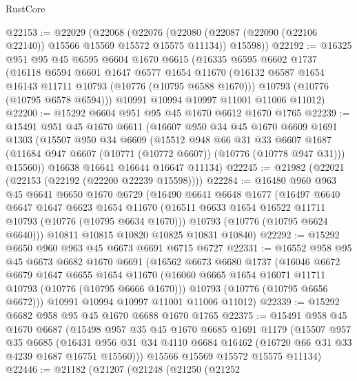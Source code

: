 \begin{lexlean}{RustCore}
\begin{coremodule}
@22153 := @22029
    (@22068
      (@22076 (@22080 (@22087 (@22090 (@22106 @22140)) @15566 @15569 @15572 @15575 @11134)) @15598))
@22192 := @16325
    @951
    @95
    @45
    @6595
    @6604
    @1670
    @6615
    (@16335
      @6595
      @6602
      @1737
      (@16118
        @6594
        @6601
        @1647
        @6577
        @1654
        @11670
        (@16132 @6587 @1654 @16143 @11711 @10793 (@10776 (@10795 @6588 @1670)))
        @10793
        (@10776 (@10795 @6578 @6594)))
      @10991
      @10994
      @10997
      @11001
      @11006
      @11012)
@22200 := @15292 @6604 @951 @95 @45 @1670 @6612 @1670 @1765
@22239 := @15491
    @951
    @45
    @1670
    @6611
    (@16607
      @950
      @34
      @45
      @1670
      @6609
      @1691
      @1303
      (@15507
        @950
        @34
        @6609
        (@15512
          @948
          @66
          @31
          @33
          @6607
          @1687
          (@11684 @947 @6607 (@10771 (@10772 @6607)) (@10776 (@10778 @947 @31)))
          @15560))
      @16638
      @16641
      @16644
      @16647
      @11134)
@22245 := @21982 (@22021 (@22153 (@22192 (@22200 @22239 @15598))))
@22284 := @16480
    @960
    @963
    @45
    @6641
    @6650
    @1670
    @6729
    (@16490
      @6641
      @6648
      @1677
      (@16497
        @6640
        @6647
        @1647
        @6623
        @1654
        @11670
        (@16511 @6633 @1654 @16522 @11711 @10793 (@10776 (@10795 @6634 @1670)))
        @10793
        (@10776 (@10795 @6624 @6640)))
      @10811
      @10815
      @10820
      @10825
      @10831
      @10840)
@22292 := @15292 @6650 @960 @963 @45 @6673 @6691 @6715 @6727
@22331 := @16552
    @958
    @95
    @45
    @6673
    @6682
    @1670
    @6691
    (@16562
      @6673
      @6680
      @1737
      (@16046
        @6672
        @6679
        @1647
        @6655
        @1654
        @11670
        (@16060 @6665 @1654 @16071 @11711 @10793 (@10776 (@10795 @6666 @1670)))
        @10793
        (@10776 (@10795 @6656 @6672)))
      @10991
      @10994
      @10997
      @11001
      @11006
      @11012)
@22339 := @15292 @6682 @958 @95 @45 @1670 @6688 @1670 @1765
@22375 := @15491
    @958
    @45
    @1670
    @6687
    (@15498
      @957
      @35
      @45
      @1670
      @6685
      @1691
      @1179
      (@15507
        @957
        @35
        @6685
        (@16431 @956 @31 @34 @4110 @6684 @16462 (@16720 @66 @31 @33 @4239 @1687 @16751 @15560)))
      @15566
      @15569
      @15572
      @15575
      @11134)
@22446 := @21182
    (@21207
      (@21248
        (@21250
          (@21252

\end{coremodule}
\end{lexlean}
